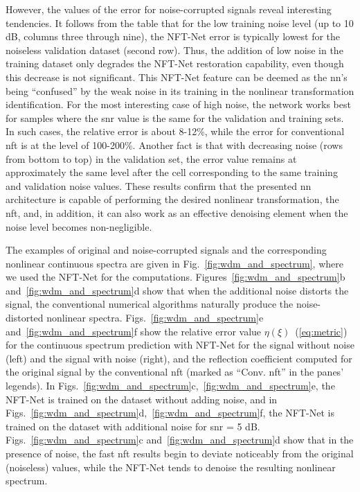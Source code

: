 However, the values of the error for noise-corrupted signals reveal interesting tendencies. 
It follows from the table that for the low training noise level (up to 10 dB, columns three through nine), the NFT-Net error is typically lowest for the noiseless validation dataset (second row).
Thus, the addition of low noise in the training dataset only degrades the NFT-Net restoration capability, even though this decrease is not significant. This NFT-Net feature can be deemed as the \acrshort{nn}'s being ``confused'' by the weak noise in its training in the nonlinear transformation identification. 
For the most interesting case of high noise, the network works best for samples where the \acrshort{snr} value is the same for the validation and training sets. 
In such cases, the relative error is about 8-12\%, while the error for conventional \acrshort{nft} is at the level of 100-200\%.
Another fact is that with decreasing noise (rows from bottom to top) in the validation set, the error value remains at approximately the same level after the cell corresponding to the same training and validation noise values. 
These results confirm that the presented \acrshort{nn} architecture is capable of performing the desired nonlinear transformation, the \acrshort{nft}, and, in addition, it can also work as an effective denoising element when the noise level becomes non-negligible. 



The examples of original and noise-corrupted signals and the corresponding nonlinear continuous spectra are given in Fig.~\ref{fig:wdm_and_spectrum}, where we used the NFT-Net for the computations. Figures~\ref{fig:wdm_and_spectrum}b and~\ref{fig:wdm_and_spectrum}d show that when the additional noise distorts the signal, the conventional numerical algorithms naturally produce the noise-distorted nonlinear spectra.
Figs.~\ref{fig:wdm_and_spectrum}e and~\ref{fig:wdm_and_spectrum}f show the relative error value $\eta(\xi)$~(\ref{eq:metric}) for the continuous spectrum prediction with NFT-Net for the signal without noise (left) and the signal with noise (right), and the reflection coefficient computed for the original signal by the conventional \acrshort{nft} (marked as ``Conv. \acrshort{nft}'' in the panes' legends). In Figs.~\ref{fig:wdm_and_spectrum}c,~\ref{fig:wdm_and_spectrum}e, the NFT-Net is trained on the dataset without adding noise, and in Figs.~\ref{fig:wdm_and_spectrum}d,~\ref{fig:wdm_and_spectrum}f, the NFT-Net is trained on the dataset with additional noise for \acrshort{snr} = 5 dB. Figs.~\ref{fig:wdm_and_spectrum}c and~\ref{fig:wdm_and_spectrum}d show that in the presence of noise, the fast \acrshort{nft} results begin to deviate noticeably from the original (noiseless) values, while the NFT-Net tends to denoise the resulting nonlinear spectrum.









